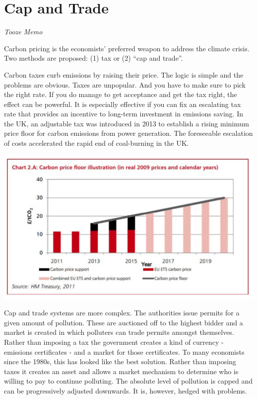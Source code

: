 \documentclass[
]{book}
\begin{document}
\hypertarget{cap-and-trade}{%
\chapter{Cap and Trade}\label{cap-and-trade}}

\emph{Tooze Memo}

Carbon pricing is the economists' preferred weapon to address the climate crisis. Two methods are proposed: (1) tax or (2) ``cap and trade''.

Carbon taxes curb emissions by raising their price. The logic is simple and the problems are obvious. Taxes are unpopular. And you have to make sure to pick the right rate. If you do manage to get acceptance and get the tax right, the effect can be powerful. It is especially effective if you can fix an escalating tax rate that provides an incentive to long-term investment in emissions saving. In the UK, an adjustable tax was introduced in 2013 to establish a rising minimum price floor for carbon emissions from power generation. The foreseeable escalation of costs accelerated the rapid end of coal-burning in the UK.

\includegraphics{fig/cap_and_trade_UK.png}

Cap and trade systems are more complex. The authorities issue permits for a given amount of pollution. These are auctioned off to the highest bidder and a market is created in which polluters can trade permits amongst themselves. Rather than imposing a tax the government creates a kind of currency - emissions certificates - and a market for those certificates. To many economists since the 1980s, this has looked like the best solution. Rather than imposing taxes it creates an asset and allows a market mechanism to determine who is willing to pay to continue polluting. The absolute level of pollution is capped and can be progressively adjusted downwards. It is, however, hedged with problems.
\end{document}
